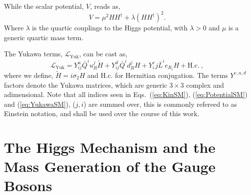 \documentclass[10pt]{report}
\begin{document}
While the scalar potential, $V$, reads as, 
%
\begin{equation}
\label{eq:PotentialSM}
V = \mu^2 H H^\dagger + \lambda (H H^\dagger)^2 .
\end{equation}
%
Where $\lambda$ is the quartic couplings to the Higgs potential, with $\lambda > 0$ and $\mu$ is a generic quartic mass term. 

The Yukawa terms, $\mathcal{L}_{\text{Yuk}}$, can be cast as, 
%
\begin{equation}
\label{eq:YukawaSM}
\mathcal{L}_{\text{Yuk}} = Y^u_{ij} \bar{Q}^i u_{R}^j  \tilde{H} + Y^d_{ij} \bar{Q}^i  d_{R}^j H  + Y^e_ij \bar{L}^i  e_{R_i} H + \text{H.c.} \ ,
\end{equation}
%
where we define, $\tilde{H}=i\sigma_2 H$ and H.c. for Hermitian conjugation. The terms $Y^{e,u,d}$ factors  denote the Yukawa matrices, which are generic $3\times3$ complex and adimensional. Note that all indices seen in Eqs.~(\ref{eq:KinSM}), (\ref{eq:PotentialSM}) and (\ref{eq:YukawaSM}), ($j,i$) are summed over, this is commonly refereed to as Einstein notation, and shall be used over the course of this work. 

\section{The Higgs Mechanism and the Mass Generation of the Gauge Bosons}
\end{document}
